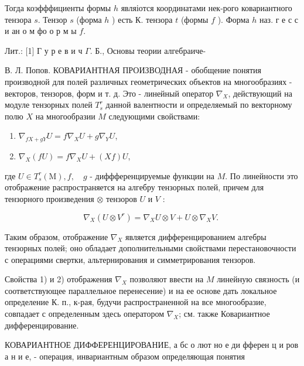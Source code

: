 \documentclass[10pt]{article}
\begin{document}
Тогда коэфффициенты формы $h$ являіотся координатами нек-рого ковариантного тензора $s$. Тензор $s$ (форма $h$ ) есть К. тензора $t$ (формы $f$ ). Форма $h$ наз. г е с с и ан о м фо о р м ы $f$.



Лит.: [1] Г у р е в и ч $\Gamma$. Б., Основы теории алгебраиче-

В. Л. Попов. КОВАРИАНТНАЯ ПРОИЗВОДНАЯ - обобщение понятия производной для полей различных геометрических объектов на многообразиях - векторов, тензоров, форм и т. д. Это - линейный оператор $\nabla_{X}$, действующий на модуле тензорных полей $T_{s}^{r}$ данной валентности и определяемый по векторному полю $X$ на многообразии $M$ следующими свойствами:



\begin{enumerate}

  \item $\nabla_{f X+g Y} U=f \nabla_{X} U+g \nabla_{Y} U$,



  \item $\nabla_{X}(f U)=f \nabla_{X} U+(X f) U$,



\end{enumerate}



где $U \in T_{s}^{r}(\mathrm{M}), f, \quad g$ - диффференцируемые функции на $M$. По линейности это отображение распространяется на алгебру тензорных полей, причем для тензорного произведения $\otimes$ тензоров $U$ и $V$ :



\[

\nabla_{X}\left(U \otimes V^{r}\right)=\nabla_{X} U \otimes V+U \otimes \nabla_{X} V \text {. }

\]



Таким образом, отображение $\nabla_{X}$ является дифференцированием алгебры тензорных полей; оно обладает дополнительными свойствами перестановочности с операциями свертки, альтернирования и симметрирования тензоров.



Свойства 1) и 2) отображения $\nabla_{X}$ позволяют ввести на $M$ линейную связность (и соответствующее параллельное перенесение) и на ее основе дать локальное определение К. п., к-рая, будучи распространенной на все многообразие, совпадает с определенным здесь оператором $\nabla_{X}$; см. также Ковариантное дифференцирование.



КОВАРИАНТНОЕ ДИФФЕРЕНЦИРОВАНИЕ, а бс о лют но е ди фферен ц и ров а н и е, - операция, инвариантным образом определяющая понятия
\end{document}
